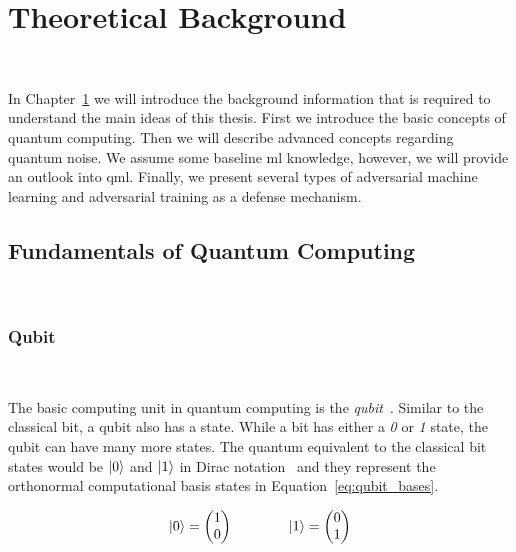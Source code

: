 \chapter{Theoretical Background}\label{chapter:background} \

In Chapter~\ref{chapter:background} we will introduce the
background information that is required to understand
the main ideas of this thesis. First we introduce
the basic concepts of quantum computing. Then we will
describe advanced concepts regarding quantum noise. We
assume some baseline \ac{ml} knowledge, however, we
will provide an outlook into \ac{qml}. Finally, we
present several types of adversarial machine learning
and adversarial training as a defense mechanism. \

\section{Fundamentals of Quantum Computing} \


\subsection{Qubit}\label{subsection:qubit} \

The basic computing unit in quantum computing is the
\textit{qubit}~\cite{schumacher_quantum_1995}. Similar to the classical
bit, a qubit also has a state. While a bit has either a
\textit{0} or \textit{1} state, the qubit can have
many more states. The quantum equivalent to the classical
bit states would be \(\ket{0}\) and \(\ket{1}\) in Dirac
notation~\cite{dirac_new_1939} and they represent the orthonormal computational
basis states in Equation~\ref{eq:qubit_bases}. \

\begin{equation}\label{eq:qubit_bases}
    \ket{0} = \begin{pmatrix}
                1 \\ 0
              \end{pmatrix} \qquad \qquad
    \ket{1} = \begin{pmatrix}
                0 \\ 1
              \end{pmatrix}
\end{equation} \

